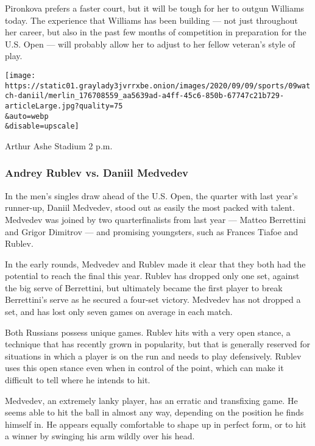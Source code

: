 Pironkova prefers a faster court, but it will be tough for her to outgun
Williams today. The experience that Williams has been building --- not
just throughout her career, but also in the past few months of
competition in preparation for the U.S. Open --- will probably allow her
to adjust to her fellow veteran's style of play.

\texttt{[image: https://static01.graylady3jvrrxbe.onion/images/2020/09/09/sports/09watch-daniil/merlin\_176708559\_aa5639ad-a4ff-45c6-850b-67747c21b729-articleLarge.jpg?quality=75\\\&auto=webp\\\&disable=upscale]}

Arthur Ashe Stadium \textbar{} 2 p.m.

\hypertarget{andrey-rublev-vs-daniil-medvedev}{%
\subsubsection{\texorpdfstring{\textbf{Andrey Rublev vs. Daniil
Medvedev}}{Andrey Rublev vs. Daniil Medvedev}}\label{andrey-rublev-vs-daniil-medvedev}}

In the men's singles draw ahead of the U.S. Open, the quarter with last
year's runner-up, Daniil Medvedev, stood out as easily the most packed
with talent. Medvedev was joined by two quarterfinalists from last year
--- Matteo Berrettini and Grigor Dimitrov --- and promising youngsters,
such as Frances Tiafoe and Rublev.

In the early rounds, Medvedev and Rublev made it clear that they both
had the potential to reach the final this year. Rublev has dropped only
one set, against the big serve of Berrettini, but ultimately became the
first player to break Berrettini's serve as he secured a four-set
victory. Medvedev has not dropped a set, and has lost only seven games
on average in each match.

Both Russians possess unique games. Rublev hits with a very open stance,
a technique that has recently grown in popularity, but that is generally
reserved for situations in which a player is on the run and needs to
play defensively. Rublev uses this open stance even when in control of
the point, which can make it difficult to tell where he intends to hit.

Medvedev, an extremely lanky player, has an erratic and transfixing
game. He seems able to hit the ball in almost any way, depending on the
position he finds himself in. He appears equally comfortable to shape up
in perfect form, or to hit a winner by swinging his arm wildly over his
head.

